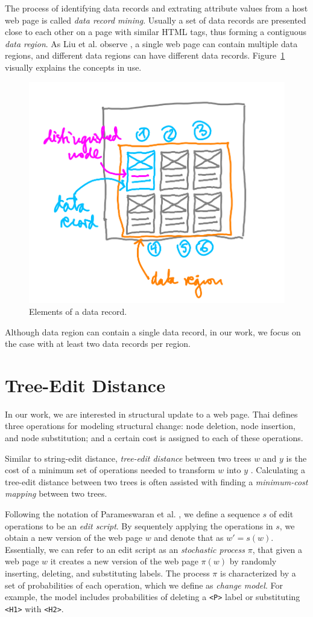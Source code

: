 The process of identifying data records and extrating attribute values from a host web page is called \emph{data record mining}. Usually a set of data records are presented close to each other on a page with similar HTML tags, thus forming a contiguous \emph{data region}. As Liu et al. observe \cite{liu2009a}, a single web page can contain multiple data regions, and different data regions can have different data records. Figure~\ref{fig:method} visually explains the concepts in use.

\begin{figure}[h]
	\centering
	\includegraphics[width=0.5\linewidth]{figures/method}
	\caption{Elements of a data record.}
	\label{fig:method}
\end{figure}

Although data region can contain a single data record, in our work, we focus on the case with at least two data records per region.


\section{Tree-Edit Distance}

In our work, we are interested in structural update to a web page. Thai \cite{Tai:1979:TCP:322139.322143} defines three operations for modeling structural change: node deletion, node insertion, and node substitution; and a certain cost is assigned to each of these operations. 

Similar to string-edit distance, \emph{tree-edit distance} between two trees $w$ and $y$ is the cost of a minimum set of operations needed to transform $w$ into $y$ \cite{zhai2005a}. Calculating a tree-edit distance between two trees is often assisted with finding a \emph{minimum-cost mapping} between two trees. 

Following the notation of Parameswaran et al. \cite{DBLP:journals/pvldb/ParameswaranDGR11}, we define a sequence $s$ of edit operations to be an \emph{edit script}. By sequentely applying the operations in $s$, we obtain a new version of the web page $w$ and denote that as $w' = s(w)$. Essentially, we can refer to an edit script as an \emph{stochastic process} $\pi$, that given a web page $w$ it creates a new version of the web page $\pi(w)$ by randomly inserting, deleting, and substituting labels. The process $\pi$ is characterized by a set of probabilities of each operation, which we define as \emph{change model}. For example, the model includes probabilities of deleting a \texttt{<P>} label or substituting \texttt{<H1>} with \texttt{<H2>}.


